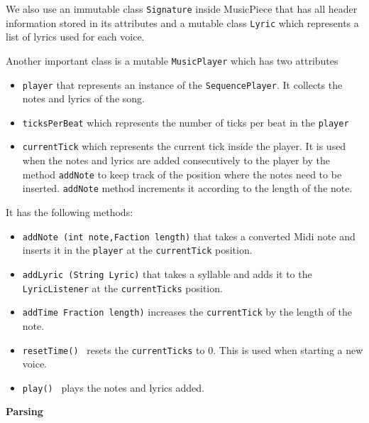 \documentclass[12pt]{book}
\begin{document}
We also use an immutable class {\tt Signature} inside MusicPiece that has all header information stored in its attributes and a mutable class {\tt Lyric} which represents a list of lyrics used for each voice.

\bigskip
Another important class is a mutable {\tt MusicPlayer} which has two attributes 
\begin{itemize} 
\item { \tt player} that represents an instance of the {\tt SequencePlayer}. It collects the notes and lyrics of the song.
\item { \tt ticksPerBeat} which represents the number of ticks per beat in the {\tt player}
\item { \tt currentTick} which represents the current tick inside the player. It is used when the notes and lyrics are added consecutively to the player by the method {\tt addNote} to keep track of the position  where the notes need to be inserted. {\tt addNote} method increments it according to the length of the note.
\end{itemize}
It has the following methods:
\begin{itemize} 
\item { \tt addNote (int note,Faction length)} that takes a converted Midi note and inserts it in the {\tt player} at the {\tt currentTick} position.
\item { \tt addLyric (String Lyric)} that takes a syllable and adds it to the {\tt LyricListener} at the {\tt currentTicks} position.
\item { \tt addTime Fraction length)} increases the {\tt currentTick} by the length of the note.
\item { \tt resetTime() } resets the {\tt currentTicks} to 0. This is used when starting a new voice.
\item { \tt play() } plays the notes and lyrics added.
\end{itemize}


\centerline{{\large \bf Parsing }}
\end{document}
